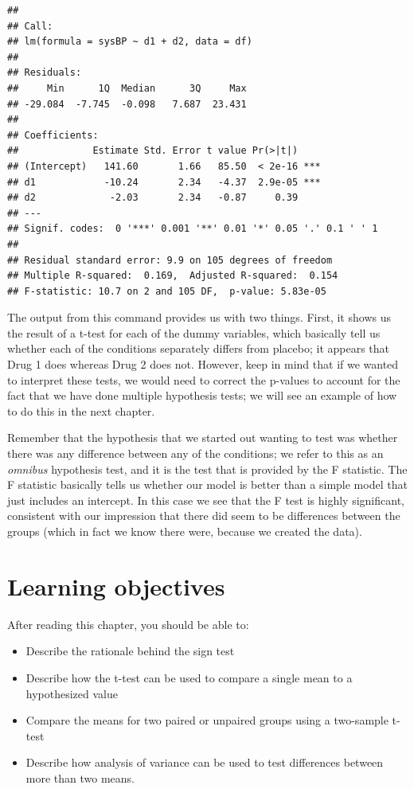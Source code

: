 \documentclass[12pt,]{book}
\providecommand{\tightlist}{%
  \setlength{\itemsep}{0pt}\setlength{\parskip}{0pt}}
\theoremstyle{definition}
\theoremstyle{definition}
\theoremstyle{definition}
\theoremstyle{remark}
\begin{document}
\begin{verbatim}
## 
## Call:
## lm(formula = sysBP ~ d1 + d2, data = df)
## 
## Residuals:
##     Min      1Q  Median      3Q     Max 
## -29.084  -7.745  -0.098   7.687  23.431 
## 
## Coefficients:
##             Estimate Std. Error t value Pr(>|t|)    
## (Intercept)   141.60       1.66   85.50  < 2e-16 ***
## d1            -10.24       2.34   -4.37  2.9e-05 ***
## d2             -2.03       2.34   -0.87     0.39    
## ---
## Signif. codes:  0 '***' 0.001 '**' 0.01 '*' 0.05 '.' 0.1 ' ' 1
## 
## Residual standard error: 9.9 on 105 degrees of freedom
## Multiple R-squared:  0.169,  Adjusted R-squared:  0.154 
## F-statistic: 10.7 on 2 and 105 DF,  p-value: 5.83e-05
\end{verbatim}

The output from this command provides us with two things. First, it shows us the result of a t-test for each of the dummy variables, which basically tell us whether each of the conditions separately differs from placebo; it appears that Drug 1 does whereas Drug 2 does not. However, keep in mind that if we wanted to interpret these tests, we would need to correct the p-values to account for the fact that we have done multiple hypothesis tests; we will see an example of how to do this in the next chapter.

Remember that the hypothesis that we started out wanting to test was whether there was any difference between any of the conditions; we refer to this as an \emph{omnibus} hypothesis test, and it is the test that is provided by the F statistic. The F statistic basically tells us whether our model is better than a simple model that just includes an intercept. In this case we see that the F test is highly significant, consistent with our impression that there did seem to be differences between the groups (which in fact we know there were, because we created the data).

\hypertarget{learning-objectives-14}{%
\section{Learning objectives}\label{learning-objectives-14}}

After reading this chapter, you should be able to:

\begin{itemize}
\tightlist
\item
  Describe the rationale behind the sign test
\item
  Describe how the t-test can be used to compare a single mean to a hypothesized value
\item
  Compare the means for two paired or unpaired groups using a two-sample t-test
\item
  Describe how analysis of variance can be used to test differences between more than two means.
\end{itemize}
\end{document}
